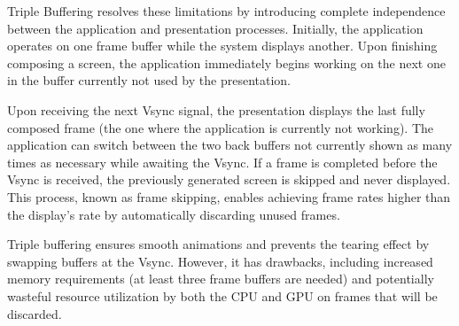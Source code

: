 Triple Buffering resolves these limitations by introducing complete independence between the application and presentation processes. 
Initially, the application operates on one frame buffer while the system displays another. 
Upon finishing composing a screen, the application immediately begins working on the next one in the buffer currently not used by the presentation.

Upon receiving the next Vsync signal, the presentation displays the last fully composed frame (the one where the application is currently not working). 
The application can switch between the two back buffers not currently shown as many times as necessary while awaiting the Vsync. 
If a frame is completed before the Vsync is received, the previously generated screen is skipped and never displayed. 
This process, known as frame skipping, enables achieving frame rates higher than the display's rate by automatically discarding unused frames.

Triple buffering ensures smooth animations and prevents the tearing effect by swapping buffers at the Vsync. 
However, it has drawbacks, including increased memory requirements (at least three frame buffers are needed) and potentially wasteful resource utilization by both the CPU and GPU on frames that will be discarded.